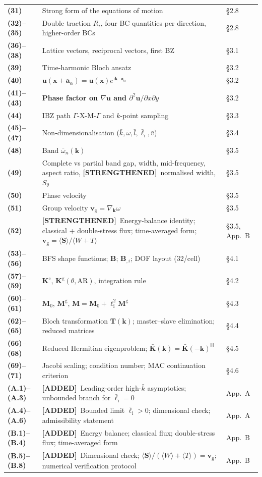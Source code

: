 \documentclass[11pt,a4paper]{article}
\newcommand{\ADDED}{{\color{addcol}\textbf{[ADDED]}}}
\newcommand{\STR}{{\color{strcol}\textbf{[STRENGTHENED]}}}
\begin{document}
\begin{longtable}{@{}>{\bfseries}p{1.5cm} L{7.4cm} L{5.4cm}@{}}
(31) & Strong form of the equations of motion & \S2.8 \\
(32)--(35) & Double traction $R_i$, four BC quantities per direction, higher-order BCs & \S2.8 \\
(36)--(38) & Lattice vectors, reciprocal vectors, first BZ & \S3.1 \\
(39) & Time-harmonic Bloch ansatz & \S3.2 \\
(40) & $\bm u(\bm x+\bm a_\alpha)=\bm u(\bm x)e^{\mathrm i\bm k\cdot\bm a_\alpha}$ & \S3.2 \\
(41)--(43) & \textbf{Phase factor on $\nabla\bm u$ and $\partial^2\bm u/\partial x\partial y$} & \S3.2 \\
(44) & IBZ path $\Gamma$-X-M-$\Gamma$ and $k$-point sampling & \S3.3 \\
(45)--(47) & Non-dimensionalisation ($\bar k,\bar\omega,\bar l,\bar\ell_{\mathrm i},\bar v$) & \S3.4 \\
(48) & Band $\bar\omega_n(\bm k)$ & \S3.5 \\
(49) & Complete vs partial band gap, width, mid-frequency, aspect ratio, \STR\ normalised width, $S_\theta$ & \S3.5 \\
(50) & Phase velocity & \S3.5 \\
(51) & Group velocity $\bm v_{\mathrm g}=\nabla_{\bm k}\omega$ & \S3.5 \\
(52) & \STR\ Energy-balance identity; classical + double-stress flux; time-averaged form; $\bm v_{\mathrm g}=\langle\bm S\rangle/\langle W+T\rangle$ & \S3.5, App.~B \\
(53)--(56) & BFS shape functions; $\bm B$; $\bm B_{,i}$; DOF layout (32/cell) & \S4.1 \\
(57)--(59) & $\bm K^{\mathrm c}$, $\bm K^{\mathrm g}(\theta,\mathrm{AR})$, integration rule & \S4.2 \\
(60)--(61) & $\bm M_0$, $\bm M^{\mathrm g}$, $\bm M=\bm M_0+\ell_{\mathrm i}^2\bm M^{\mathrm g}$ & \S4.3 \\
(62)--(65) & Bloch transformation $\bm T(\bm k)$; master--slave elimination; reduced matrices & \S4.4 \\
(66)--(68) & Reduced Hermitian eigenproblem; $\bar{\bm K}(\bm k)=\bar{\bm K}(-\bm k)^{\mathsf H}$ & \S4.5 \\
(69)--(71) & Jacobi scaling; condition number; MAC continuation criterion & \S4.6 \\
(A.1)--(A.3) & \ADDED\ Leading-order high-$\bar k$ asymptotics; unbounded branch for $\bar\ell_{\mathrm i}=0$ & App.~A \\
(A.4)--(A.6) & \ADDED\ Bounded limit $\bar\ell_{\mathrm i}>0$; dimensional check; admissibility statement & App.~A \\
(B.1)--(B.4) & \ADDED\ Energy balance; classical flux; double-stress flux; time-averaged form & App.~B \\
(B.5)--(B.8) & \ADDED\ Dimensional check; $\langle\bm S\rangle/(\langle W\rangle+\langle T\rangle)=\bm v_{\mathrm g}$; numerical verification protocol & App.~B \\
\bottomrule
\end{longtable}
\end{document}
